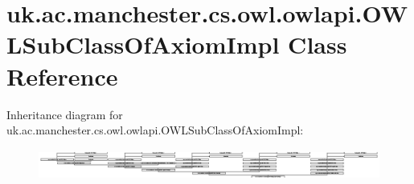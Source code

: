 \hypertarget{classuk_1_1ac_1_1manchester_1_1cs_1_1owl_1_1owlapi_1_1_o_w_l_sub_class_of_axiom_impl}{\section{uk.\-ac.\-manchester.\-cs.\-owl.\-owlapi.\-O\-W\-L\-Sub\-Class\-Of\-Axiom\-Impl Class Reference}
\label{classuk_1_1ac_1_1manchester_1_1cs_1_1owl_1_1owlapi_1_1_o_w_l_sub_class_of_axiom_impl}
}
Inheritance diagram for uk.\-ac.\-manchester.\-cs.\-owl.\-owlapi.\-O\-W\-L\-Sub\-Class\-Of\-Axiom\-Impl\-:\begin{figure}[H]
\begin{center}
\leavevmode
\includegraphics[height=1.020501cm]{classuk_1_1ac_1_1manchester_1_1cs_1_1owl_1_1owlapi_1_1_o_w_l_sub_class_of_axiom_impl}
\end{center}
\end{figure}
